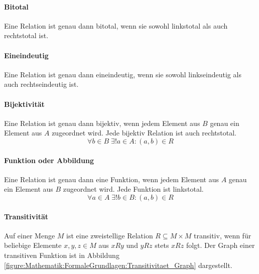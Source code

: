 \documentclass[../main.tex]{subfiles}
\begin{document}
                \paragraph{Bitotal}
                    Eine Relation ist genau dann bitotal, wenn sie sowohl linkstotal als auch rechtstotal ist.            
                    
                \paragraph{Eineindeutig}
                    Eine Relation ist genau dann eineindeutig, wenn sie sowohl linkseindeutig als auch rechtseindeutig ist.
                    
                \paragraph{Bijektivität}
                    Eine Relation ist genau dann bijektiv, wenn jedem Element aus $B$ genau ein Element aus $A$ zugeordnet wird. Jede bijektiv Relation ist auch rechtstotal. %
                    \begin{equation}
                        \forall b \in B\; \exists! a \in A\colon \left(a, b\right) \in R
                    \end{equation}
                    
                \paragraph{Funktion oder Abbildung}
                    Eine Relation ist genau dann eine Funktion, wenn jedem Element aus $A$ genau ein Element aus $B$ zugeordnet wird. Jede Funktion ist linkstotal. %
                    \begin{equation}
                        \forall a \in A\; \exists! b \in B\colon \left(a, b\right) \in R
                    \end{equation}
                    
                \paragraph{Transitivität}
                    Auf einer Menge $M$ ist eine zweistellige Relation $R \subseteq M \times M$ transitiv, wenn für beliebige Elemente $x, y, z \in M$ aus $xRy$ und $yRz$ stets $xRz$ folgt. Der Graph einer transitiven Funktion ist in Abbildung \ref{figure:Mathematik:FormaleGrundlagen:Transitivitaet_Graph} dargestellt.
                    
\end{document}
